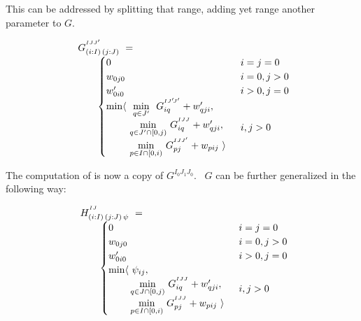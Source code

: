This can be addressed by splitting that range, adding yet range another parameter to $G$.

\begin{equation}\LeftEqNo
\begin{array}{l@{}l}
	G^{^{IJJ'}}_{(i:I)\,(j:J)} ~=~  \\
	\qquad
	\begin{cases}
		0                         & i=j=0 \\
		w_{0j0}                   & i=0, j>0 \\
		w'_{0i0}                  & i>0, j=0 \\
		\begin{array}{@{}l@{~}l}
		  \min\langle & \underset{~q\in J'~}\min ~ G^{^{IJ'\!J'}}_{iq} + \yw{qji}, \\
		              & \underset{q\in J'\cap[0,j)}\min ~ G^{^{IJJ}}_{iq} + \yw{qji}, \\
		              & \underset{p\in I\cap[0,i)}\min ~ G^{^{IJJ'}}_{pj} + \xw{pij}~\rangle
		\end{array}              & i,j>0
	\end{cases}
\end{array}
\end{equation}

The computation of  is now a copy of $G^{I_0J_1J_0}$. ~$G$ can be further generalized in the following
way:

\newcommand{\Ggen}{H}

\begin{equation}\LeftEqNo
\begin{array}{l@{}l}
	\Ggen^{^{IJ}}_{(i:I)\,(j:J)\,\psi} ~=~  \\
	\qquad
	\begin{cases}
		0                         & i=j=0 \\
		w_{0j0}                   & i=0, j>0 \\
		w'_{0i0}                  & i>0, j=0 \\
		\begin{array}{@{}l@{~}l}
		  \min\langle & \psi_{ij}, \\
		              & \!\underset{q\in J\cap[0,j)}\min ~ G^{^{IJJ}}_{iq} + \yw{qji}, \\
		              & \!\underset{p\in I\cap[0,i)}\min ~ G^{^{IJJ}}_{pj} + \xw{pij}~\rangle
		\end{array}              & i,j>0
	\end{cases}
\end{array}
\label{intro:Ggen}
\end{equation}

